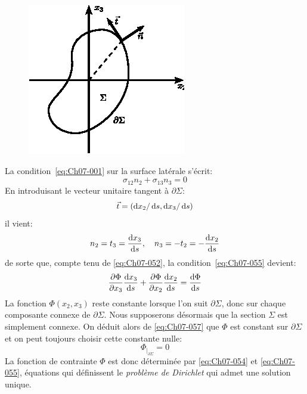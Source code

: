 \begin{figure}
    \begin{center}
        \includegraphics{../images/T1_Ch07-14}
    \end{center}
\end{figure}
\noindent La condition~\eqref{eq:Ch07-001} sur la surface latérale s'écrit:
\begin{equation}
    \sigma_{12} n_2 + \sigma_{13} n_3 = 0
    \label{eq:Ch07-055}
\end{equation}
En introduisant le vecteur unitaire tangent à $\partial \Sigma$:
    \begin{equation}
        \vec{t} = \left( \mathop{\mathrm{{}d}}\mathopen{} x_2 / \mathop{\mathrm{{}d}}\mathopen{} s, \mathop{\mathrm{{}d}}\mathopen{} x_3/\mathop{\mathrm{{}d}}\mathopen{} s \right)
    \end{equation}
    il vient:
\begin{equation}
    n_2 = t_3 = \frac{\mathop{\mathrm{{}d}}\mathopen{} x_3}{\mathop{\mathrm{{}d}}\mathopen{} s}, \quad n_3 = -t_2 = - \frac{\mathop{\mathrm{{}d}}\mathopen{} x_2}{\mathop{\mathrm{{}d}}\mathopen{} s}
    \label{eq:Ch07-056}
\end{equation}
de sorte que, compte tenu de \eqref{eq:Ch07-052}, la condition~\eqref{eq:Ch07-055} devient:
\begin{equation}
    \frac{\partial \Phi}{\partial x_3} \frac{\mathop{\mathrm{{}d}}\mathopen{} x_3}{\mathop{\mathrm{{}d}}\mathopen{} s} + \frac{\partial \Phi}{\partial x_2} \frac{\mathop{\mathrm{{}d}}\mathopen{} x_2}{\mathop{\mathrm{{}d}}\mathopen{} s} = \frac{\mathop{\mathrm{{}d}}\mathopen{} \Phi}{\mathop{\mathrm{{}d}}\mathopen{} s}
    \label{eq:Ch07-057}
\end{equation}
La fonction $\Phi\left( x_2, x_3 \right)$ reste constante lorsque l'on suit $\partial \Sigma$, donc sur chaque composante connexe de $\partial \Sigma$.
Nous supposerons désormais que la section $\Sigma$ est simplement connexe.
On déduit alors de \eqref{eq:Ch07-057} que $\Phi$ est constant sur $\partial \Sigma$ et on peut toujours choisir cette constante nulle:
\begin{equation}
    \Phi_{|_{\partial \Sigma}} = 0
    \label{eq:Ch07-058}
\end{equation}
La fonction de contrainte $\Phi$ est donc déterminée par \eqref{eq:Ch07-054} et \eqref{eq:Ch07-055}, équations qui définissent le \emph{problème de Dirichlet} qui admet une solution unique.
